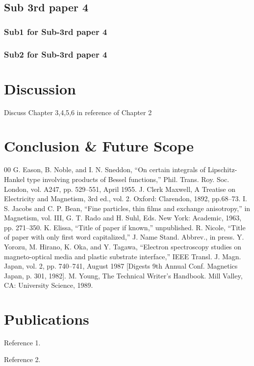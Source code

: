 \documentclass[12pt,a4paper]{report}
\begin{document}
\section{Sub 3rd paper 4}
\subsection{Sub1  for Sub-3rd paper 4}
\subsection{Sub2  for Sub-3rd paper 4}
\chapter{Discussion}
\noindent{\rule{\textwidth}{1.5pt}}
Discuss Chapter 3,4,5,6 in reference of Chapter 2
\chapter{Conclusion \& Future Scope}
\noindent{\rule{\textwidth}{1.5pt}}

\begin{thebibliography}{00}
	 G. Eason, B. Noble, and I. N. Sneddon, ``On certain integrals of Lipschitz-Hankel type involving products of Bessel functions,'' Phil. Trans. Roy. Soc. London, vol. A247, pp. 529--551, April 1955.
	 J. Clerk Maxwell, A Treatise on Electricity and Magnetism, 3rd ed., vol. 2. Oxford: Clarendon, 1892, pp.68--73.
	 I. S. Jacobs and C. P. Bean, ``Fine particles, thin films and exchange anisotropy,'' in Magnetism, vol. III, G. T. Rado and H. Suhl, Eds. New York: Academic, 1963, pp. 271--350.
	 K. Elissa, ``Title of paper if known,'' unpublished.
	 R. Nicole, ``Title of paper with only first word capitalized,'' J. Name Stand. Abbrev., in press.
	 Y. Yorozu, M. Hirano, K. Oka, and Y. Tagawa, ``Electron spectroscopy studies on magneto-optical media and plastic substrate interface,'' IEEE Transl. J. Magn. Japan, vol. 2, pp. 740--741, August 1987 [Digests 9th Annual Conf. Magnetics Japan, p. 301, 1982].
	 M. Young, The Technical Writer's Handbook. Mill Valley, CA: University Science, 1989.
\end{thebibliography}
\chapter*{Publications}
\begin{enumerate}[{[1]}]
	\item Reference 1.
	\item Reference 2.
\end{enumerate}
\end{document}
